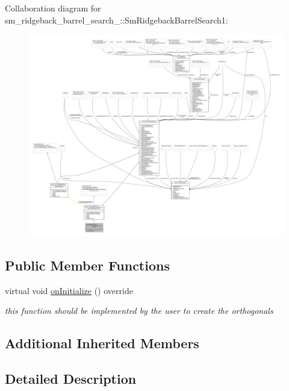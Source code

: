 Collaboration diagram for sm\+\_\+ridgeback\+\_\+barrel\+\_\+search\+\_\+:\+:Sm\+Ridgeback\+Barrel\+Search1\+:
\nopagebreak
\begin{figure}[H]
\begin{center}
\leavevmode
\includegraphics[width=350pt]{structsm__ridgeback__barrel__search__1_1_1SmRidgebackBarrelSearch1__coll__graph}
\end{center}
\end{figure}
\subsection*{Public Member Functions}
\begin{DoxyCompactItemize}
\item 
virtual void \hyperlink{structsm__ridgeback__barrel__search__1_1_1SmRidgebackBarrelSearch1_a01130957b940856c2ceb7710c37078de}{on\+Initialize} () override
\begin{DoxyCompactList}\small\item\em this function should be implemented by the user to create the orthogonals \end{DoxyCompactList}\end{DoxyCompactItemize}
\subsection*{Additional Inherited Members}


\subsection{Detailed Description}


